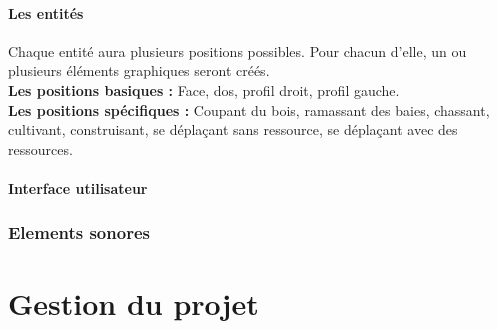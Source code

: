 \documentclass[a4paper]{article}
\newcommand{\alinea}{\hspace*{0.5cm}}
\begin{document}
      \subsection{Les entités}
        \alinea Chaque entité aura plusieurs positions possibles. Pour chacun d'elle, un ou plusieurs éléments graphiques seront créés.\\
        \textbf{Les positions basiques :} Face, dos, profil droit, profil gauche.\\
        \textbf{Les positions spécifiques :} Coupant du bois, ramassant des baies, chassant, cultivant, construisant, se déplaçant sans ressource, se déplaçant avec des ressources.
	
      \subsection{Interface utilisateur}
		
    \section{Elements sonores}
    

  \newpage
  \part{Gestion du projet}
\end{document}
